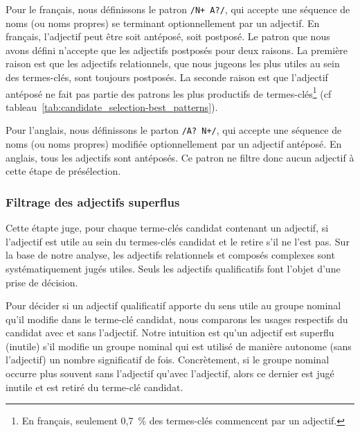         Pour le français, nous définissons le patron \texttt{/N+ A?/}, qui
        accepte une séquence de noms (ou noms propres) se terminant
        optionnellement par un adjectif. En français, l'adjectif peut être soit
        antéposé, soit postposé. Le patron que nous avons défini n'accepte que
        les adjectifs postposés pour deux raisons. La première raison est que
        les adjectifs relationnels, que nous jugeons les
        plus utiles au sein des termes-clés, sont toujours postposés. La seconde
        raison est que l'adjectif antéposé ne fait pas partie des patrons les
        plus productifs de termes-clés\footnote{En français, seulement 0,7~\%
        des termes-clés commencent par un adjectif.} (cf
        tableau~\ref{tab:candidate_selection-best_patterns}).
        
        Pour l'anglais, nous définissons le parton \texttt{/A? N+/}, qui accepte
        une séquence de noms (ou noms propres) modifiée optionnellement par un
        adjectif antéposé. En anglais, tous les adjectifs sont antéposés. Ce
        patron ne filtre donc aucun adjectif à cette étape de présélection.

      \subsubsection{Filtrage des adjectifs superflus}
      \label{subsubsec:main:domain_independent_keyphrase_extraction-keyphrase_candidate_selection-modifiers_filtering-adjective_filtering}
        Cette étapte juge, pour chaque terme-clés candidat contenant un
        adjectif, si l'adjectif est utile au sein du termes-clés candidat et le
        retire s'il ne l'est pas. Sur la base de notre analyse, les adjectifs
        relationnels et composés complexes sont systématiquement jugés utiles.
        Seuls les adjectifs qualificatifs font l'objet d'une prise de décision.

        Pour décider si un adjectif qualificatif apporte du sens utile au groupe
        nominal qu'il modifie dans le terme-clé candidat, nous comparons les
        usages respectifs du candidat avec et sans l'adjectif. Notre intuition
        est qu'un adjectif est superflu (inutile) s'il modifie un groupe nominal
        qui est utilisé de manière autonome (sans l'adjectif) un nombre
        significatif de fois. Concrètement, si le groupe nominal occurre plus
        souvent sans l'adjectif qu'avec l'adjectif, alors ce dernier est jugé
        inutile et est retiré du terme-clé candidat.

